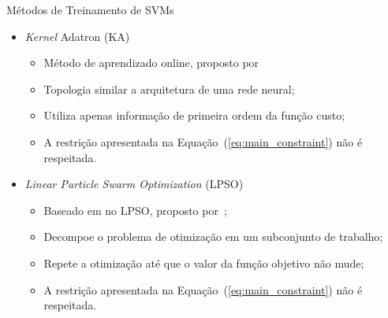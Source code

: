 \documentclass{beamer}
\begin{document}
\begin{frame}{Métodos de Treinamento de SVMs}
  
  \begin{itemize}
    \item \textit{Kernel} Adatron (KA)
    \begin{itemize}
      \item Método de aprendizado online, proposto por~
      \item Topologia similar a arquitetura de uma rede neural;
      \item Utiliza apenas informação de primeira ordem da função custo;
      \item A restrição apresentada na Equação~(\ref{eq:main_constraint}) não é respeitada.
    \end{itemize}
    \vspace{0.5em}
    \item \textit{Linear Particle Swarm Optimization} (LPSO)
    \begin{itemize}
      \item Baseado em no LPSO, proposto por~;
      \item Decompoe o problema de otimização em um subconjunto de trabalho;
      \item Repete a otimização até que o valor da função objetivo não mude;
      \item A restrição apresentada na Equação~(\ref{eq:main_constraint}) não é respeitada.
    \end{itemize}
    
  \end{itemize}
\end{frame}
\end{document}
